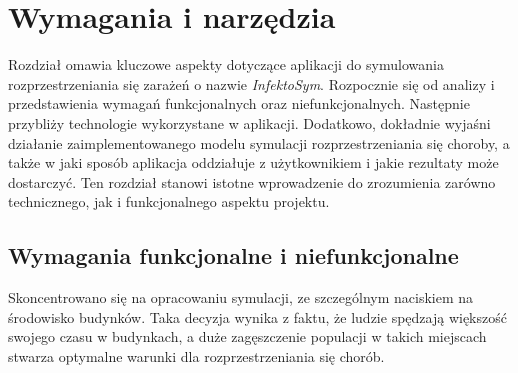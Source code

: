 \chapter{Wymagania i narzędzia}
\label{ch:wymagania-i-narzedzia}
Rozdział omawia kluczowe aspekty dotyczące aplikacji do symulowania rozprzestrzeniania się zarażeń o nazwie \textit{InfektoSym}. Rozpocznie się od analizy i przedstawienia wymagań funkcjonalnych oraz niefunkcjonalnych. Następnie przybliży technologie wykorzystane w aplikacji. Dodatkowo, dokładnie wyjaśni działanie zaimplementowanego modelu symulacji rozprzestrzeniania się choroby, a także w jaki sposób aplikacja oddziałuje z użytkownikiem i jakie rezultaty może dostarczyć. Ten rozdział stanowi istotne wprowadzenie do zrozumienia zarówno technicznego, jak i funkcjonalnego aspektu projektu.

\section{\textbf{Wymagania funkcjonalne i niefunkcjonalne}}

Skoncentrowano się na opracowaniu symulacji, ze szczególnym naciskiem na środowisko budynków. Taka decyzja wynika z faktu, że ludzie spędzają większość swojego czasu w budynkach, a duże zagęszczenie populacji w takich miejscach stwarza optymalne warunki dla rozprzestrzeniania się chorób.

